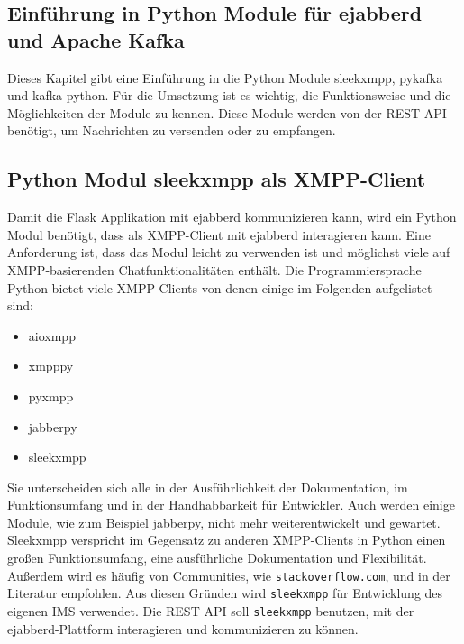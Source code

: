 \documentclass[a4paper,titlepage,halfparskip,12pt]{scrreprt}
\begin{document}
\begin{onehalfspacing}
\pagebreak

\chapter{Einführung in Python Module für ejabberd und Apache Kafka}
\label{chap:pythonModule}

Dieses Kapitel gibt eine Einführung in die Python Module sleekxmpp, pykafka und kafka-python. Für die Umsetzung ist es wichtig, die Funktionsweise und die Möglichkeiten der Module zu kennen. Diese Module werden von der \acs{REST} \acs{API} benötigt, um Nachrichten zu versenden oder zu empfangen.


\section{Python Modul sleekxmpp als \acs{XMPP}-Client}
\label{sec:SleekxmppModul}

Damit die Flask Applikation mit ejabberd kommunizieren kann, wird ein Python Modul benötigt, dass als \acs{XMPP}-Client mit ejabberd interagieren kann. Eine Anforderung ist, dass das Modul leicht zu verwenden ist und möglichst viele auf \acs{XMPP}-basierenden Chatfunktionalitäten enthält. Die Programmiersprache Python bietet viele \acs{XMPP}-Clients von denen einige im Folgenden aufgelistet sind:

\begin{itemize}
\item aioxmpp
\item xmpppy
\item pyxmpp
\item jabberpy
\item sleekxmpp
\end{itemize}

Sie unterscheiden sich alle in der Ausführlichkeit der Dokumentation, im Funktionsumfang und in der Handhabbarkeit für Entwickler. Auch werden einige Module, wie zum Beispiel jabberpy, nicht mehr weiterentwickelt und gewartet. Sleekxmpp \cite{pythonSleekxmpp} verspricht im Gegensatz zu anderen \acs{XMPP}-Clients in Python einen großen Funktionsumfang, eine ausführliche Dokumentation und Flexibilität. Außerdem wird es häufig von Communities, wie \texttt{stackoverflow.com}, und in der Literatur \cite{definiteGuideXMPP} empfohlen. Aus diesen Gründen wird \texttt{sleekxmpp} für Entwicklung des eigenen \acs{IMS} verwendet. Die \acs{REST} \acs{API} soll \texttt{sleekxmpp} benutzen, mit der ejabberd-Plattform interagieren und kommunizieren zu können.


\end{onehalfspacing}
\end{document}
